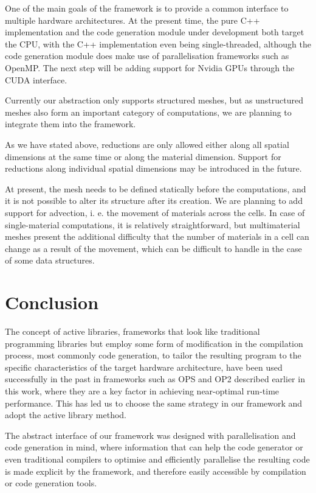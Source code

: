 \documentclass[fontsize=11pt, appendixprefix=true]{scrreprt}
\begin{document}
One of the main goals of the framework is to provide a common interface to
multiple hardware architectures. At the present time, the pure C++
implementation and the code generation module under development both target the
CPU, with the C++ implementation even being single-threaded, although the code
generation module does make use of parallelisation frameworks such as
OpenMP. The next step will be adding support for Nvidia GPUs through the CUDA
interface.

Currently our abstraction only supports structured meshes, but as unstructured
meshes also form an important category of computations, we are planning to
integrate them into the framework.

As we have stated above, reductions are only allowed either along all spatial
dimensions at the same time or along the material dimension. Support for
reductions along individual spatial dimensions may be introduced in the future.

At present, the mesh needs to be defined statically before the computations, and
it is not possible to alter its structure after its creation. We are planning to
add support for advection, i. e. the movement of materials across the cells. In
case of single-material computations, it is relatively straightforward, but
multimaterial meshes present the additional difficulty that the number of
materials in a cell can change as a result of the movement, which can be
difficult to handle in the case of some data structures.

\chapter{Conclusion}

The concept of active libraries, frameworks that look like traditional
programming libraries but employ some form of modification in the compilation
process, most commonly code generation, to tailor the resulting program to the
specific characteristics of the target hardware architecture, have been used
successfully in the past in frameworks such as OPS and OP2 described earlier in
this work, where they are a key factor in achieving near-optimal run-time
performance. This has led us to choose the same strategy in our framework and
adopt the active library method.

The abstract interface of our framework was designed with parallelisation and
code generation in mind, where information that can help the code generator or
even traditional compilers to optimise and efficiently parallelise the resulting
code is made explicit by the framework, and therefore easily accessible by
compilation or code generation tools.
\end{document}
